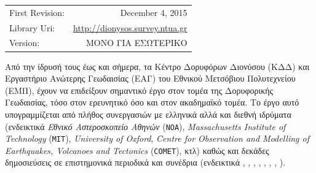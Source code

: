 \documentclass[11pt]{article}
\begin{document}
\begin{titlepage}
\begin{center}
        \@date
        
        \vspace{2.0cm}
        
      \begin{center}
      \begin{tabular}{l r}
      First Revision: & December 4, 2015 \\
      Library Uri:    & \url{http://dionysos.survey.ntua.gr} \\
      Version:        & ΜΟΝΟ ΓΙΑ ΕΣΩΤΕΡΙΚΟ
      \end{tabular}
      \end{center}
  
  \end{center}
\end{titlepage}
\makeatother



\clearpage

\clearpage

Από την ίδρυσή τους έως και σήμερα, τα Κέντρο Δορυφόρων Διονύσου (ΚΔΔ) και Εργαστήριο Ανώτερης Γεωδαισίας (ΕΑΓ) του Εθνικού Μετσόβιου Πολυτεχνείου (ΕΜΠ), έχουν να επιδείξουν σημαντικό έργο στον τομέα της Δορυφορικής Γεωδαισίας, τόσο στον ερευνητικό όσο και στον ακαδημαϊκό τομέα. Το έργο αυτό υπογραμμίζεται από πλήθος συνεργασιών με ελληνικά αλλά και διεθνή ιδρύματα (ενδεικτικά \textit{Εθνικό Αστεροσκοπείο Αθηνών} (\texttt{NOA}), \textit{Massachusetts Institute of Technology} (\texttt{MIT}), \textit{University of Oxford}, \textit{Centre for Observation and Modelling of Earthquakes, Volcanoes and Tectonics} (\texttt{COMET}), κτλ) καθώς και δεκάδες δημοσιεύσεις σε επιστημονικά περιοδικά και συνέδρια (ενδεικτικά \cite{Billiris1991}, \cite{JGRB11137}, \cite{Cocard199939}, \cite{JGRB12107}, \cite{Reilinger201022}, \cite{JGRB16426}, \cite{Parks2012}, \cite{Ganas201362}).
\end{document}
